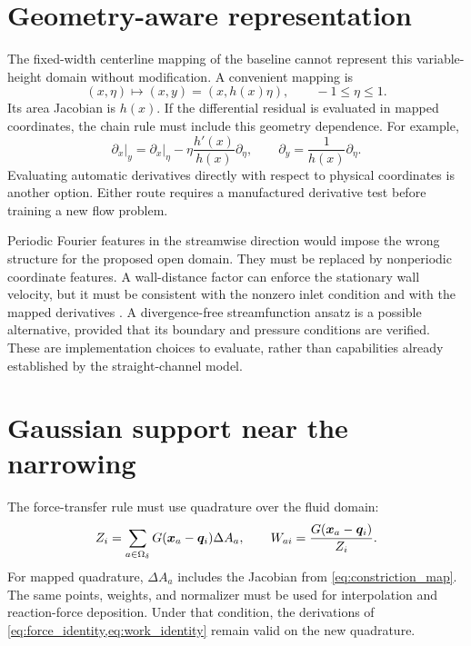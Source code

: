 \section{Geometry-aware representation}
The fixed-width centerline mapping of the baseline cannot represent this
variable-height domain without modification. A convenient mapping is
\begin{equation}
 (x,\eta)\longmapsto(x,y)=(x,h(x)\eta),\qquad -1\leq\eta\leq1.
 \label{eq:constriction_map}
\end{equation}
Its area Jacobian is $h(x)$. If the differential residual is evaluated in
mapped coordinates, the chain rule must include this geometry dependence.
For example,
\begin{equation}
 \left.\partial_x\right|_y
 =\left.\partial_x\right|_\eta
 -\eta\frac{h'(x)}{h(x)}\partial_\eta,\qquad
 \partial_y=\frac{1}{h(x)}\partial_\eta.
 \label{eq:mapped_derivatives}
\end{equation}
Evaluating automatic derivatives directly with respect to physical
coordinates is another option. Either route requires a manufactured
derivative test before training a new flow problem.

Periodic Fourier features in the streamwise direction would impose the
wrong structure for the proposed open domain. They must be replaced by
nonperiodic coordinate features. A wall-distance factor can enforce the
stationary wall velocity, but it must be consistent with the nonzero inlet
condition and with the mapped derivatives \citep{sukumar2022}. %
 A divergence-free streamfunction
ansatz is a possible alternative, provided that its boundary and pressure
conditions are verified. These are implementation choices to evaluate,
rather than capabilities already established by the straight-channel model.

\section{Gaussian support near the narrowing}
The force-transfer rule must use quadrature over the fluid domain:
\begin{equation}
 Z_i=\sum_{a\in\Omega_\delta}
 G(\bm{x}_a-\bm{q}_i)\Delta A_a,\qquad
 W_{ai}=\frac{G(\bm{x}_a-\bm{q}_i)}{Z_i}.
 \label{eq:constriction_normalization}
\end{equation}
For mapped quadrature, $\Delta A_a$ includes the Jacobian from
\cref{eq:constriction_map}. The same points, weights, and normalizer must
be used for interpolation and reaction-force deposition. Under that
condition, the derivations of \cref{eq:force_identity,eq:work_identity}
remain valid on the new quadrature.


